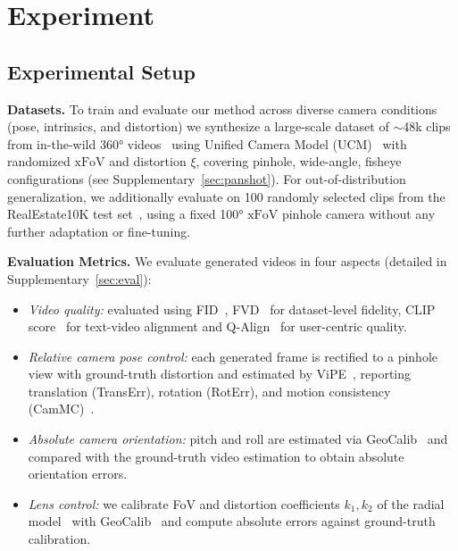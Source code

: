 \section{Experiment}
\label{sec:experiment}






\subsection{Experimental Setup}
\label{sec:setup}

\noindent\textbf{Datasets.}
To train and evaluate our method across diverse camera conditions (pose, intrinsics, and distortion) we synthesize a large-scale dataset of $\sim$48k clips from in-the-wild 360° videos~\cite{wallingford2024image} using Unified Camera Model (UCM)~\cite{mei2007single} with randomized $\mathrm{xFoV}$ and distortion $\xi$, covering pinhole, wide-angle, fisheye configurations (see Supplementary~\cref{sec:panshot}).
For out-of-distribution generalization, we additionally evaluate on 100 randomly selected clips from the RealEstate10K test set~\cite{zhou2018stereo}, using a fixed 100° \(\mathrm{xFoV}\) pinhole camera without any further adaptation or fine-tuning.

\noindent\textbf{Evaluation Metrics.}
We evaluate generated videos in four aspects (detailed in Supplementary~\cref{sec:eval}):
\begin{itemize}[leftmargin=0pt, wide=0pt]
    \item \emph{Video quality:} evaluated using FID~\cite{heusel2017gans}, FVD~\cite{unterthiner2018towards} for dataset-level fidelity, CLIP score~\cite{radford2021learning} for text-video alignment and Q-Align~\cite{wu2024q} for user-centric quality.
    \item \emph{Relative camera pose control:} each generated frame is rectified to a pinhole view with ground-truth distortion and estimated by ViPE~\cite{huang2025vipe}, reporting translation (TransErr), rotation (RotErr), and motion consistency (CamMC)~\cite{he2024cameractrl, wang2024motionctrl}.
    \item \emph{Absolute camera orientation:} pitch and roll are estimated via GeoCalib~\cite{veicht2024geocalib} and compared with the ground-truth video estimation to obtain absolute orientation errors.
    \item \emph{Lens control:} we calibrate FoV and distortion coefficients \(k_1, k_2\) of the radial model~\cite{Brown1966DecenteringDO} with GeoCalib~\cite{veicht2024geocalib} and compute absolute errors against ground-truth calibration.
\end{itemize}

